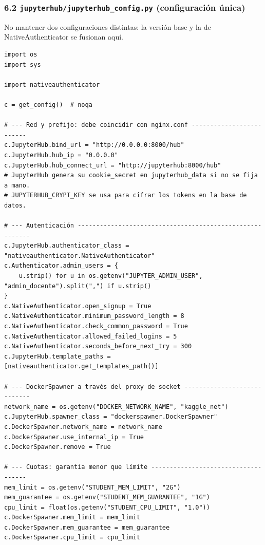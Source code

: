 \documentclass[11pt,a4paper]{article}
\begin{document}
\hypertarget{62-jupyterhubjupyterhub_configpy-configuraciuxf3n-uxfanica}{%
\subsubsection{\texorpdfstring{6.2 \texttt{jupyterhub/\allowbreak{}jupyterhub\_\allowbreak{}config.\allowbreak{}py} (configuración única)}{6.2 jupyterhub/jupyterhub\_config.py (configuración única)}}\label{62-jupyterhubjupyterhub_configpy-configuraciuxf3n-uxfanica}}

No mantener dos configuraciones distintas: la versión base y la de NativeAuthenticator se fusionan aquí.

\begin{lstlisting}
import os
import sys

import nativeauthenticator

c = get_config()  # noqa

# --- Red y prefijo: debe coincidir con nginx.conf -------------------------
c.JupyterHub.bind_url = "http://0.0.0.0:8000/hub"
c.JupyterHub.hub_ip = "0.0.0.0"
c.JupyterHub.hub_connect_url = "http://jupyterhub:8000/hub"
# JupyterHub genera su cookie_secret en jupyterhub_data si no se fija a mano.
# JUPYTERHUB_CRYPT_KEY se usa para cifrar los tokens en la base de datos.

# --- Autenticación ---------------------------------------------------------
c.JupyterHub.authenticator_class = "nativeauthenticator.NativeAuthenticator"
c.Authenticator.admin_users = {
    u.strip() for u in os.getenv("JUPYTER_ADMIN_USER", "admin_docente").split(",") if u.strip()
}
c.NativeAuthenticator.open_signup = True
c.NativeAuthenticator.minimum_password_length = 8
c.NativeAuthenticator.check_common_password = True
c.NativeAuthenticator.allowed_failed_logins = 5
c.NativeAuthenticator.seconds_before_next_try = 300
c.JupyterHub.template_paths = [nativeauthenticator.get_templates_path()]

# --- DockerSpawner a través del proxy de socket ----------------------------
network_name = os.getenv("DOCKER_NETWORK_NAME", "kaggle_net")
c.JupyterHub.spawner_class = "dockerspawner.DockerSpawner"
c.DockerSpawner.network_name = network_name
c.DockerSpawner.use_internal_ip = True
c.DockerSpawner.remove = True

# --- Cuotas: garantía menor que límite ------------------------------------
mem_limit = os.getenv("STUDENT_MEM_LIMIT", "2G")
mem_guarantee = os.getenv("STUDENT_MEM_GUARANTEE", "1G")
cpu_limit = float(os.getenv("STUDENT_CPU_LIMIT", "1.0"))
c.DockerSpawner.mem_limit = mem_limit
c.DockerSpawner.mem_guarantee = mem_guarantee
c.DockerSpawner.cpu_limit = cpu_limit


\end{lstlisting}
\end{document}
